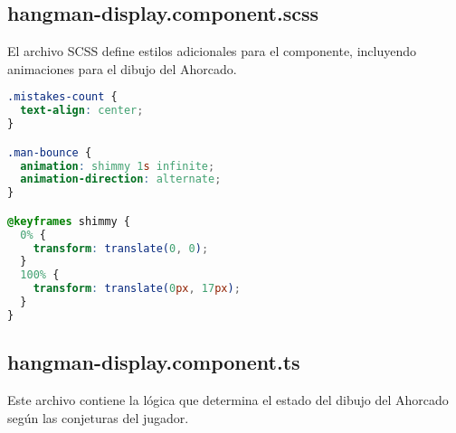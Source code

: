 \subsection{hangman-display.component.scss}

El archivo SCSS define estilos adicionales para el componente, incluyendo animaciones para el dibujo del Ahorcado.

\begin{lstlisting}[language=CSS]
.mistakes-count {
  text-align: center;
}

.man-bounce {
  animation: shimmy 1s infinite;
  animation-direction: alternate;
}

@keyframes shimmy {
  0% {
    transform: translate(0, 0);
  }
  100% {
    transform: translate(0px, 17px);
  }
}
\end{lstlisting}

\subsection{hangman-display.component.ts}

Este archivo contiene la lógica que determina el estado del dibujo del Ahorcado según las conjeturas del jugador.

